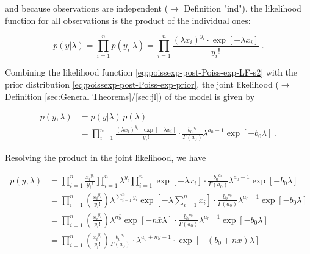 \documentclass[a4paper,12pt]{book}
\begin{document}
and because observations are independent ($\rightarrow$ Definition "ind"), the likelihood function for all observations is the product of the individual ones:

\begin{equation} \label{eq:poissexp-post-Poiss-exp-LF-s2}
p(y|\lambda) = \prod_{i=1}^n p(y_i|\lambda) = \prod_{i=1}^n \frac{(\lambda x_i)^{y_i} \cdot \exp\left[-\lambda x_i\right]}{y_i !} \; .
\end{equation}

Combining the likelihood function \eqref{eq:poissexp-post-Poiss-exp-LF-s2} with the prior distribution \eqref{eq:poissexp-post-Poiss-exp-prior}, the joint likelihood ($\rightarrow$ Definition \ref{sec:General Theorems}/\ref{sec:jl}) of the model is given by

\begin{equation} \label{eq:poissexp-post-Poiss-exp-JL-s1}
\begin{split}
p(y,\lambda) &= p(y|\lambda) \, p(\lambda) \\
&= \prod_{i=1}^n \frac{(\lambda x_i)^{y_i} \cdot \exp\left[-\lambda x_i\right]}{y_i !} \cdot \frac{ {b_0}^{a_0}}{\Gamma(a_0)} \lambda^{a_0-1} \exp[-b_0 \lambda] \; .
\end{split}
\end{equation}

Resolving the product in the joint likelihood, we have

\begin{equation} \label{eq:poissexp-post-Poiss-JL-s2}
\begin{split}
p(y,\lambda) &= \prod_{i=1}^n \frac{ {x_i}^{y_i}}{y_i !} \prod_{i=1}^n \lambda^{y_i} \prod_{i=1}^n \exp\left[-\lambda x_i\right] \cdot \frac{ {b_0}^{a_0}}{\Gamma(a_0)} \lambda^{a_0-1} \exp[-b_0 \lambda] \\
&= \prod_{i=1}^n \left(\frac{ {x_i}^{y_i}}{y_i !}\right) \lambda^{\sum_{i=1}^n y_i} \exp\left[-\lambda \sum_{i=1}^n x_i\right] \cdot \frac{ {b_0}^{a_0}}{\Gamma(a_0)} \lambda^{a_0-1} \exp[-b_0 \lambda] \\
&= \prod_{i=1}^n \left(\frac{ {x_i}^{y_i}}{y_i !}\right) \lambda^{n \bar{y}} \exp\left[-n \bar{x} \lambda\right] \cdot \frac{ {b_0}^{a_0}}{\Gamma(a_0)} \lambda^{a_0-1} \exp[-b_0 \lambda] \\
&= \prod_{i=1}^n \left(\frac{ {x_i}^{y_i}}{y_i !}\right) \frac{ {b_0}^{a_0}}{\Gamma(a_0)}  \cdot \lambda^{a_0 + n \bar{y} - 1} \cdot \exp\left[-(b_0 + n \bar{x}) \lambda\right] \\
\end{split}
\end{equation}
\end{document}

